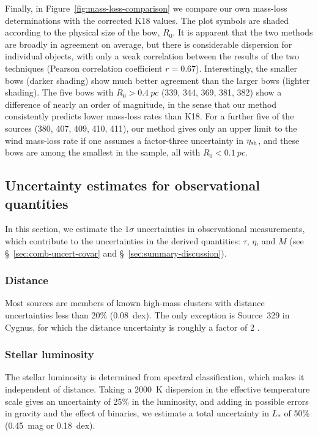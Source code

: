 Finally, in Figure~\ref{fig:mass-loss-comparison} we compare our own
mass-loss determinations with the corrected K18 values.  The plot
symbols are shaded according to the physical size of the bow, \(R_0\).
It is apparent that the two methods are broadly in agreement on
average, but there is considerable dispersion for individual objects,
with only a weak correlation between the results of the two techniques
(Pearson correlation coefficient \(r = 0.67\)).  Interestingly, the
smaller bows (darker shading) show much better agreement than the
larger bows (lighter shading).  The five bows with
\(R_0 > \SI{0.4}{pc}\) (339, 344, 369, 381, 382) show a difference of
nearly an order of magnitude, in the sense that our method
consistently predicts lower mass-loss rates than K18.  For a further
five of the sources (380, 407, 409, 410, 411), our method gives only
an upper limit to the wind mass-loss rate if one assumes a
factor-three uncertainty in \(\eta_{\text{sh}}\), and these bows are among
the smallest in the sample, all with \(R_0 < \SI{0.1}{pc}\).

\subsection{Uncertainty estimates for observational quantities}
\label{sec:uncert-estim-observ}

In this section, we estimate the \(1\sigma\) uncertainties in
observational measurements, which contribute to the uncertainties in
the derived quantities: \(\tau\), \(\eta\), and \(\dot M\) (see
\S~\ref{sec:comb-uncert-covar} and \S~\ref{sec:summary-discussion}).

\subsubsection{Distance}
\label{sec:distance}

Most sources are members of known high-mass clusters with distance
uncertainties less than 20\% (0.08~dex). The only exception is
Source~329 in Cygnus, for which the distance uncertainty is roughly a
factor of 2 \citep{Kobulnicky:2018a}.

\subsubsection{Stellar luminosity}
\label{sec:stellar-luminosity}

The stellar luminosity is determined from spectral classification,
which makes it independent of distance.  Taking a \SI{2000}{K}
dispersion in the effective temperature scale \citep{Martins:2005a}
gives an uncertainty of 25\% in the luminosity, and adding in possible
errors in gravity and the effect of binaries, we estimate a total
uncertainty in \(L_*\) of 50\% (0.45~mag or 0.18~dex).

